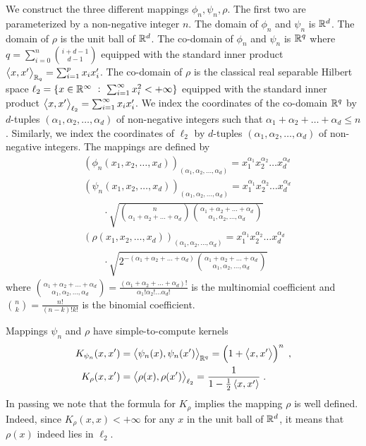 We construct the three different mappings $\phi_n, \psi_n, \rho$. The first two
are parameterized by a non-negative integer $n$. The domain of $\phi_n$ and
$\psi_n$ is $\mathbb{R}^d$. The domain of $\rho$ is the unit ball of $\mathbb{R}^d$. The
co-domain of $\phi_n$ and $\psi_n$ is $\mathbb{R}^q$ where $q = \sum_{i=0}^n
\binom{i+d-1}{d-1}$ equipped with the standard inner product $\left\langle x, x' \right\rangle_{\mathbb{R}_q} =
\sum_{i=1}^p x_i x'_i$. The co-domain of $\rho$ is the classical real separable Hilbert space
$\ell_2 = \{ x \in \mathbb{R}^\infty ~:~ \sum_{i=1}^\infty x_i^2 < + \infty \}$ equipped
with the standard inner product $\left\langle x, x' \right\rangle_{\ell_2} = \sum_{i=1}^\infty x_i x'_i$. We
index the coordinates of the co-domain $\mathbb{R}^q$ by $d$-tuples $(\alpha_1,
\alpha_2, \dots, \alpha_d)$ of non-negative integers such that $\alpha_1 +
\alpha_2 + \dots + \alpha_d \le n$. Similarly, we index the coordinates of
$\ell_2$ by $d$-tuples $(\alpha_1, \alpha_2, \dots, \alpha_d)$ of non-negative
integers. The mappings are defined by
\begin{align*}
& \left(\phi_n(x_1, x_2, \dots, x_d)\right)_{(\alpha_1, \alpha_2, \dots, \alpha_d)}
= x_1^{\alpha_1} x_2^{\alpha_2} \dots x_d^{\alpha_d}
\\
& \left(\psi_n(x_1, x_2, \dots, x_d)\right)_{(\alpha_1, \alpha_2, \dots, \alpha_d)} = x_1^{\alpha_1} x_2^{\alpha_2} \dots x_d^{\alpha_d} \\
& \qquad \cdot \sqrt{\binom{n}{\alpha_1 + \alpha_2 + \dots + \alpha_d} \binom{\alpha_1 + \alpha_2 + \dots + \alpha_d}{\alpha_1, \alpha_2, \dots, \alpha_d}}
\\
& \left(\rho(x_1, x_2, \dots, x_d)\right)_{(\alpha_1, \alpha_2, \dots, \alpha_d)} = x_1^{\alpha_1} x_2^{\alpha_2} \dots x_d^{\alpha_d} \\
& \qquad \cdot \sqrt{2^{-(\alpha_1 + \alpha_2 + \dots + \alpha_d)} \binom{\alpha_1 + \alpha_2 + \dots + \alpha_d}{\alpha_1, \alpha_2, \dots, \alpha_d}}
\end{align*}
where $\binom{\alpha_1 + \alpha_2 + \dots + \alpha_d}{\alpha_1, \alpha_2, \dots, \alpha_d} = \frac{(\alpha_1 + \alpha_2 + \dots + \alpha_d)!}{\alpha_1! \alpha_2! \dots \alpha_d!}$
is the multinomial coefficient and $\binom{n}{k} = \frac{n!}{(n-k)!k!}$ is the binomial coefficient.

Mappings $\psi_n$ and $\rho$ have simple-to-compute kernels
\begin{align*}
K_{\psi_n}(x,x') & = \left\langle \psi_n(x), \psi_n(x') \right\rangle_{\mathbb{R}^q} = \left( 1 + \left\langle x, x' \right\rangle \right)^n \; , \\
K_{\rho}(x,x') & = \left\langle \rho(x), \rho(x') \right\rangle_{\ell_2} = \frac{1}{1 - \frac{1}{2}\left\langle x, x' \right\rangle} \; .
\end{align*}
In passing we note that the formula for $K_\rho$ implies the mapping $\rho$ is
well defined. Indeed, since $K_{\rho}(x,x) < +\infty$ for any $x$ in the unit
ball of $\mathbb{R}^d$, it means that $\rho(x)$ indeed lies in $\ell_2$.

